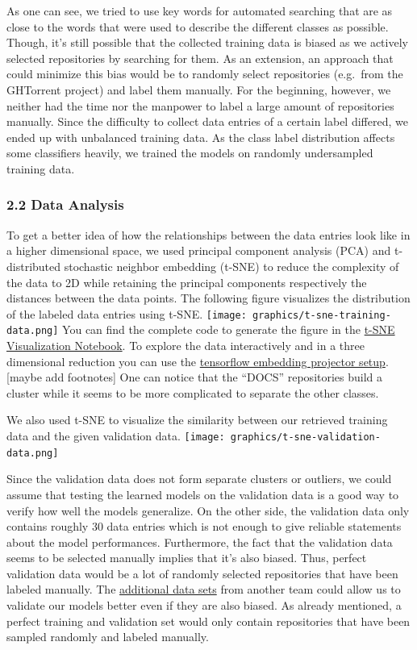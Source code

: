 \documentclass{article}
\begin{document}
As one can see, we tried to use key words for automated searching that
are as close to the words that were used to describe the different
classes as possible. Though, it's still possible that the collected
training data is biased as we actively selected repositories by
searching for them. As an extension, an approach that could minimize
this bias would be to randomly select repositories (e.g.~from the
GHTorrent project) and label them manually. For the beginning, however,
we neither had the time nor the manpower to label a large amount of
repositories manually. Since the difficulty to collect data entries of a
certain label differed, we ended up with unbalanced training data. As
the class label distribution affects some classifiers heavily, we
trained the models on randomly undersampled training data.

\subsubsection{2.2 Data Analysis}\label{data-analysis}

To get a better idea of how the relationships between the data entries
look like in a higher dimensional space, we used principal component
analysis (PCA) and t-distributed stochastic neighbor embedding (t-SNE)
to reduce the complexity of the data to 2D while retaining the principal
components respectively the distances between the data points. The
following figure visualizes the distribution of the labeled data entries
using t-SNE.
\texttt{[image: graphics/t-sne-training-data.png]}
You can find the complete code to generate the figure in the
\href{https://github.com/WGierke/git_better/blob/master/t-SNE\%20Visualization.ipynb}{t-SNE
Visualization Notebook}. To explore the data interactively and in a
three dimensional reduction you can use the
\href{https://github.com/WGierke/git_better\#usage}{tensorflow embedding
projector setup}. {[}maybe add footnotes{]} One can notice that the
``DOCS'' repositories build a cluster while it seems to be more
complicated to separate the other classes.

We also used t-SNE to visualize the similarity between our retrieved
training data and the given validation data.
\texttt{[image: graphics/t-sne-validation-data.png]}

Since the validation data does not form separate clusters or outliers,
we could assume that testing the learned models on the validation data
is a good way to verify how well the models generalize. On the other
side, the validation data only contains roughly 30 data entries which is
not enough to give reliable statements about the model performances.
Furthermore, the fact that the validation data seems to be selected
manually implies that it's also biased. Thus, perfect validation data
would be a lot of randomly selected repositories that have been labeled
manually. The
\href{https://github.com/InformatiCup/InformatiCup2017/tree/master/additional_data_sets}{additional
data sets} from another team could allow us to validate our models
better even if they are also biased. As already mentioned, a perfect
training and validation set would only contain repositories that have
been sampled randomly and labeled manually.
\end{document}

